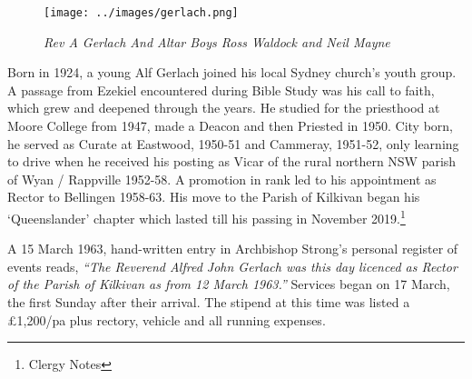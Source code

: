 \begin{figure}[!htb]
\begin{center}
\texttt{[image: ../images/gerlach.png]}
\caption{\itshape Rev A Gerlach And Altar Boys Ross Waldock and Neil Mayne}
\end{center}
\end{figure}




Born in 1924, a young Alf Gerlach joined his local Sydney church's youth group. A passage from Ezekiel encountered during Bible Study was his call to faith, which grew and deepened through the years. He studied for the priesthood at Moore College from 1947, made a Deacon and then Priested in 1950. City born, he served as Curate at Eastwood, 1950-51 and Cammeray, 1951-52, only learning to drive when he received his posting as Vicar of the rural northern NSW parish of Wyan / Rappville 1952-58. A promotion in rank led to his appointment as Rector to Bellingen 1958-63. His move to the Parish of Kilkivan began his `Queenslander' chapter which lasted till his passing in November 2019.\footnote{Clergy Notes}


A 15 March 1963, hand-written entry in Archbishop Strong's personal register of events reads, \emph{``The Reverend Alfred John Gerlach was this day licenced as Rector of the Parish of Kilkivan as from 12 March 1963.''} Services began on 17 March, the first Sunday after their arrival. The stipend at this time was listed a \pounds1,200/pa plus rectory, vehicle and all running expenses.









